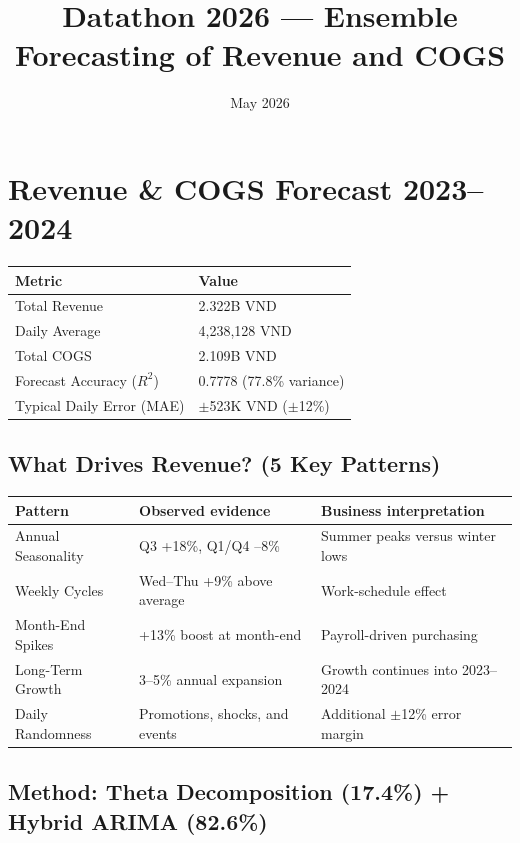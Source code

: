 \documentclass[12pt,a4paper]{article}
\title{\textbf{Datathon 2026 --- Ensemble Forecasting of Revenue and COGS}}
\author{}
\date{May 2026}
\begin{document}
\section{Revenue \& COGS Forecast 2023--2024}
\begin{center}
\centering
{}
\label{tab:forecast-summary}
\begin{tabular}{ll}
\toprule
\textbf{Metric} & \textbf{Value} \\
\midrule
Total Revenue & 2.322B VND \\
Daily Average & 4,238,128 VND \\
Total COGS & 2.109B VND \\
Forecast Accuracy ($R^2$) & 0.7778 (77.8\% variance) \\
Typical Daily Error (MAE) & $\pm$523K VND ($\pm$12\%) \\
\bottomrule
\end{tabular}
\end{center}

\subsection*{What Drives Revenue? (5 Key Patterns)}

\begin{center}
\centering
{}
\label{tab:revenue-drivers}
\small
\begin{tabular}{p{4cm}p{4.2cm}p{5cm}}
\toprule
\textbf{Pattern} & \textbf{Observed evidence} & \textbf{Business interpretation} \\
\midrule
Annual Seasonality & Q3 +18\%, Q1/Q4 --8\% & Summer peaks versus winter lows \\
Weekly Cycles & Wed--Thu +9\% above average & Work-schedule effect \\
Month-End Spikes & +13\% boost at month-end & Payroll-driven purchasing \\
Long-Term Growth & 3--5\% annual expansion & Growth continues into 2023--2024 \\
Daily Randomness & Promotions, shocks, and events & Additional $\pm$12\% error margin \\
\bottomrule
\end{tabular}
\end{center}

\subsection*{Method: Theta Decomposition (17.4\%) + Hybrid ARIMA (82.6\%)}
\end{document}
